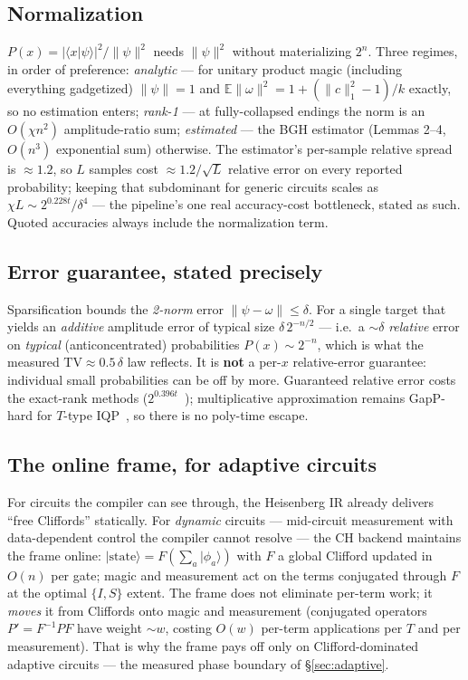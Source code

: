 \documentclass[11pt]{article}
\newcommand{\ket}[1]{\lvert #1 \rangle}
\newcommand{\bra}[1]{\langle #1 \rvert}
\begin{document}
\subsection{Normalization}\label{sec:norm-theory}
$P(x)=|\bra x\psi\rangle|^2/\lVert\psi\rVert^2$ needs $\lVert\psi\rVert^2$
without materializing $2^n$. Three regimes, in order of preference:
\emph{analytic} --- for unitary product magic (including everything
gadgetized) $\lVert\psi\rVert=1$ and
$\mathbb{E}\lVert\omega\rVert^2 = 1+(\lVert c\rVert_1^2-1)/k$ exactly, so no
estimation enters; \emph{rank-1} --- at fully-collapsed endings the norm is
an $O(\chi n^2)$ amplitude-ratio sum; \emph{estimated} --- the BGH estimator
(Lemmas 2--4, $O(n^3)$ exponential sum) otherwise. The estimator's
per-sample relative spread is $\approx\!1.2$, so $L$ samples cost
$\approx\!1.2/\sqrt L$ relative error on every reported probability; keeping
that subdominant for generic circuits scales as
$\chi L \sim 2^{0.228t}/\delta^4$ --- the pipeline's one real accuracy-cost
bottleneck, stated as such. Quoted accuracies always include the
normalization term.

\subsection{Error guarantee, stated precisely}\label{sec:guarantee}
Sparsification bounds the \emph{2-norm} error
$\lVert\psi-\omega\rVert\le\delta$. For a single target that yields an
\emph{additive} amplitude error of typical size $\delta\,2^{-n/2}$ --- i.e.\ a
$\sim\!\delta$ \emph{relative} error on \emph{typical} (anticoncentrated)
probabilities $P(x)\sim2^{-n}$, which is what the measured
$\mathrm{TV}\approx0.5\,\delta$ law reflects. It is \textbf{not} a per-$x$
relative-error guarantee: individual small probabilities can be off by more.
Guaranteed relative error costs the exact-rank methods
($2^{0.396t}$~\cite{qassim2021}); multiplicative approximation remains
GapP-hard for $T$-type IQP~\cite{bremner2016}, so there is no poly-time
escape.

\subsection{The online frame, for adaptive circuits}\label{sec:frame-theory}
For circuits the compiler can see through, the Heisenberg IR already
delivers ``free Cliffords'' statically. For \emph{dynamic} circuits ---
mid-circuit measurement with data-dependent control the compiler cannot
resolve --- the CH backend maintains the frame online:
$\ket{\mathrm{state}}=F(\sum_a\ket{\phi_a})$ with $F$ a global Clifford
updated in $O(n)$ per gate; magic and measurement act on the terms conjugated
through $F$ at the optimal $\{I,S\}$ extent. The frame does not eliminate
per-term work; it \emph{moves} it from Cliffords onto magic and measurement
(conjugated operators $P'=F^{-1}PF$ have weight $\sim w$, costing $O(w)$
per-term applications per $T$ and per measurement). That is why the frame
pays off only on Clifford-dominated adaptive circuits --- the measured phase
boundary of \S\ref{sec:adaptive}.
\end{document}
